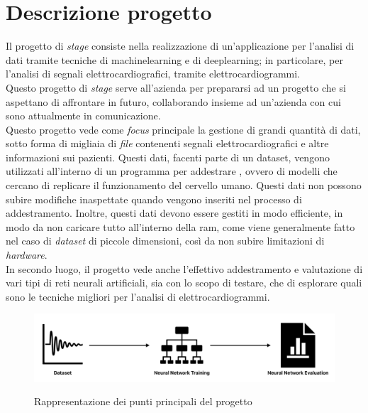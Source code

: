 \section{Descrizione progetto}\label{sec:project-description}\noindent
Il progetto di \textit{stage} consiste nella realizzazione di un'applicazione per l'analisi di dati tramite tecniche di \gls{machinelearning} e di \gls{deeplearning}; in particolare, per l'analisi di segnali elettrocardiografici, tramite elettrocardiogrammi.\\
Questo progetto di \textit{stage} serve all'azienda per prepararsi ad un progetto che si aspettano di affrontare in futuro, collaborando insieme ad un'azienda con cui sono attualmente in comunicazione.\\
Questo progetto vede come \textit{focus} principale la gestione di grandi quantità di dati, sotto forma di migliaia di \textit{file} contenenti segnali elettrocardiografici e altre informazioni sui pazienti.
Questi dati, facenti parte di un \gls{dataset}, vengono utilizzati all'interno di un programma per addestrare , ovvero di modelli che cercano di replicare il funzionamento del cervello umano.
Questi dati non possono subire modifiche inaspettate quando vengono inseriti nel processo di addestramento.
Inoltre, questi dati devono essere gestiti in modo efficiente, in modo da non caricare tutto all'interno della \gls{ram}, come viene generalmente fatto nel caso di \textit{dataset} di piccole dimensioni, così da non subire limitazioni di \textit{hardware}.\\
In secondo luogo, il progetto vede anche l'effettivo addestramento e valutazione di vari tipi di reti neurali artificiali, sia con lo scopo di testare, che di esplorare quali sono le tecniche migliori per l'analisi di elettrocardiogrammi.
\begin{figure}[H]
    \centering
    \includegraphics[alt={Rappresentazione dei punti principali del progetto}, width=0.9\columnwidth]{img/desc_proj.png}
    \caption{\centering Rappresentazione dei punti principali del progetto}
    \label{fig:desc-proj}
\end{figure}

